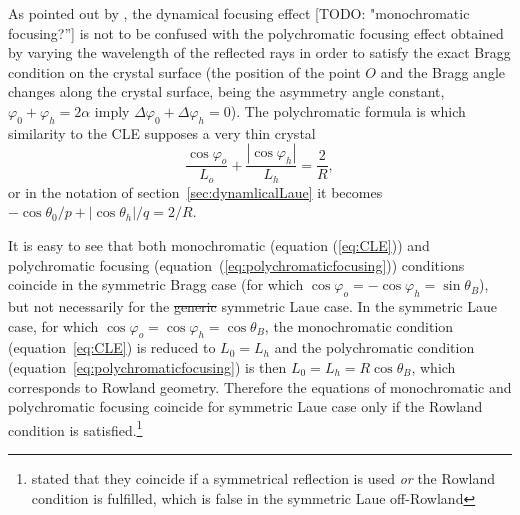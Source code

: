\documentclass[preprint]{iucr}              %
\newcommand{\todo}[1]{{\color{red}[TODO: "#1'']}}
\newcommand{\inred}[1]{{\color{red}#1}}
\begin{document}
As pointed out by \cite{CK}, the dynamical focusing effect \todo{monochromatic focusing?} is not to be confused with the polychromatic focusing effect \cite{handbook} obtained by varying the wavelength of the reflected rays in order to satisfy the exact Bragg condition on the crystal surface (the position of the point $O$ and the Bragg angle changes along the crystal surface, being the asymmetry angle constant, $\varphi_0+\varphi_h=2\alpha$ imply $\Delta\varphi_0+\Delta\varphi_h=0$). 
The polychromatic formula is \inred{which similarity to the CLE supposes a very thin crystal}
\begin{equation}
\label{eq:polychromaticfocusing}
\frac{{\cos {\varphi _o}}}{{{L_o}}} + \frac{{\left| {\cos {\varphi _h}} \right|}}{{{L_h}}} = \frac{2}{R},
\end{equation}
or in the notation of section~\ref{sec:dynamlicalLaue} it becomes $-\cos\theta_0/p + |\cos\theta_h|/q=2/R$. 

It is easy to see that both monochromatic (equation (\ref{eq:CLE})) and polychromatic focusing (equation~(\ref{eq:polychromaticfocusing})) conditions coincide in the symmetric Bragg case (for which $\cos\varphi_o=-\cos\varphi_h=\sin\theta_B$), but not necessarily for the \inred{\sout{generic} symmetric} Laue case. In the symmetric Laue case, for which $\cos\varphi_o=\cos\varphi_h=\cos\theta_B$, the monochromatic condition (equation~\ref{eq:CLE}) is reduced to $L_0=L_h$ and the polychromatic condition (equation~\ref{eq:polychromaticfocusing}) is then $L_0=L_h=R\cos\theta_B$, which corresponds to Rowland geometry. Therefore the equations of monochromatic and polychromatic focusing coincide for symmetric Laue case only if the Rowland condition is satisfied.\footnote{\cite{CK} stated that they coincide if a symmetrical reflection is used {\it or} the Rowland condition is fulfilled, which is false in the symmetric Laue off-Rowland}
\end{document}
